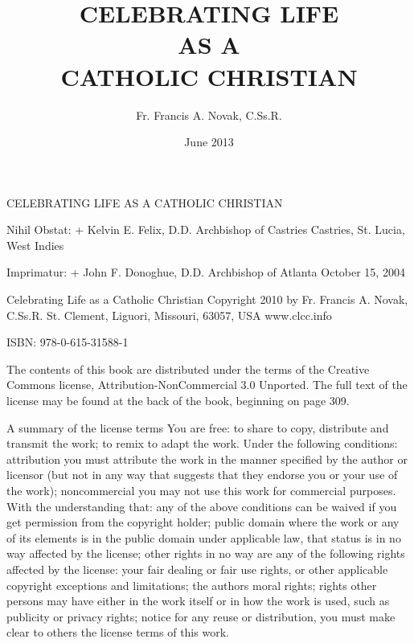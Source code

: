 \documentclass[oneside]{book}
\title{\textbf{CELEBRATING LIFE} \\ AS A \\ \textbf{CATHOLIC CHRISTIAN}}
\author{Fr. Francis A. Novak, C.Ss.R.}  \date{June 2013}
\begin{document}
\pagestyle{plain}


\frontmatter

\setcounter{secnumdepth}{-1}
\section*{} 

CELEBRATING LIFE AS A CATHOLIC CHRISTIAN


Nihil Obstat: + Kelvin E. Felix, D.D.  Archbishop of Castries Castries,
St. Lucia, West Indies

Imprimatur: + John F. Donoghue, D.D.  Archbishop of Atlanta October 15, 2004

Celebrating Life as a Catholic Christian Copyright 2010 by Fr. Francis A. Novak,
C.Ss.R.  St. Clement, Liguori, Missouri, 63057, USA www.clcc.info

ISBN: 978-0-615-31588-1

The contents of this book are distributed under the terms of the Creative
Commons license, Attribution-NonCommercial 3.0 Unported. The full text of the
license may be found at the back of the book, beginning on page 309.

A summary of the license terms You are free: to share to copy, distribute and
transmit the work; to remix to adapt the work. Under the following conditions:
attribution you must attribute the work in the manner specified by the author or
licensor (but not in any way that suggests that they endorse you or your use of
the work); noncommercial you may not use this work for commercial purposes. With
the understanding that: any of the above conditions can be waived if you get
permission from the copyright holder; public domain where the work or any of its
elements is in the public domain under applicable law, that status is in no way
affected by the license; other rights in no way are any of the following rights
affected by the license: your fair dealing or fair use rights, or other
applicable copyright exceptions and limitations; the authors moral rights;
rights other persons may have either in the work itself or in how the work is
used, such as publicity or privacy rights; notice for any reuse or distribution,
you must make clear to others the license terms of this work.
\end{document}
